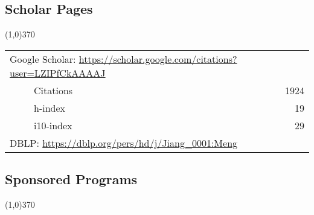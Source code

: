 \documentclass[10pt]{article}
\begin{document}
\vspace{-0.6cm}
\subsection{\sc Scholar Pages}
\vspace{-0.4cm} \line(1,0){370} \vspace{-0.1cm}

\begin{table}[h!]
\begin{tabular*}{12.7cm}{p{11.65cm}r}
\multicolumn{2}{l}{Google Scholar: \url{https://scholar.google.com/citations?user=LZIPfCkAAAAJ}} \\
~~~~~Citations&1924 \\
~~~~~h-index&19 \\
~~~~~i10-index&29 \\
\multicolumn{2}{l}{DBLP: \url{https://dblp.org/pers/hd/j/Jiang\_0001:Meng}} \\
\end{tabular*}
\end{table}

\subsection{\sc Sponsored Programs}
\vspace{-0.4cm} \line(1,0){370} \vspace{-0.1cm}
\end{document}
